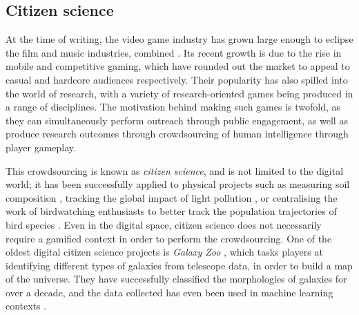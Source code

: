 \subsection{Citizen science}
\label{sec:citizen_science}
At the time of writing, the video game industry has grown large enough to eclipse the film and music industries, combined \cite{Egenfeldt-Nielsen2019}. Its recent growth is due to the rise in mobile and competitive gaming, which have rounded out the market to appeal to casual and hardcore audiences respectively.
Their popularity has also spilled into the world of research, with a variety of research-oriented games being produced in a range of disciplines. The motivation behind making such games is twofold, as they can simultaneously perform outreach through public engagement, as well as produce research outcomes through crowdsourcing of human intelligence through player gameplay.

This crowdsourcing is known as \emph{citizen science}, and is not limited to the digital world; it has been successfully applied to physical projects such as measuring soil composition \cite{Rossiter2015}, tracking the global impact of light pollution \cite{Cui2020}, or centralising the work of birdwatching enthusiasts to better track the population trajectories of bird species \cite{Link2008}.
Even in the digital space, citizen science does not necessarily require a gamified context in order to perform the crowdsourcing. One of the oldest digital citizen science projects is \emph{Galaxy Zoo} \cite{Masters2019}, which tasks players at identifying different types of galaxies from telescope data, in order to build a map of the universe. They have successfully classified the morphologies of galaxies for over a decade, and the data collected has even been used in machine learning contexts \cite{Walmsley2020}.

